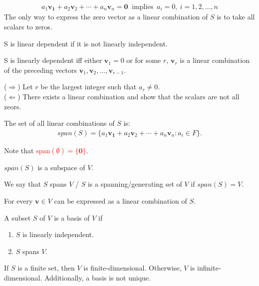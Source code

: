 \documentclass[12pt]{article}
\begin{document}
\begin{definition}
    \begin{align*}
        a_1\mathbf{v_1}+a_2\mathbf{v}_2+\cdots+a_n\mathbf{v}_n=\mathbf{0}\ \text{ implies }\, a_i =0 ,\ i=1,2,\ldots,n
    \end{align*}
The only way to express the zero vector as a linear combination of $S$ is to take all scalars to zeros.
\end{definition}

S is linear dependent if it is not linearly independent.

\begin{theorem}
   S is linearly dependent iff either $\mathbf{v}_1=0$ or for some $r$,
   $\mathbf{v}_r$ is a linear combination of the preceding vectors $\mathbf{v}_1,\mathbf{v}_2,\ldots,\mathbf{v}_{r-1}$.
\label{linear-dependent-algorithm}
\end{theorem}


\begin{tcolorbox}[boxrule=0.5pt]
\begin{pf}
($\Rightarrow$) Let $r$ be the largest integer such that $a_r\neq 0$.\\
($\Leftarrow$) There exists a linear combination and show that the scalars are not all zeors.
\end{pf}
\end{tcolorbox}

\begin{definition}
    The set of all linear combinations of $S$ is:
    \begin{align*}
        span(S)=\{a_1\mathbf{v_1}+a_2\mathbf{v}_2+\cdots+a_n\mathbf{v}_n:a_i\in F\}.
    \end{align*}
\end{definition}

Note that \textcolor{red}{$\text{span}(\emptyset)=\{\mathbf{0}\}$}.

\begin{theorem}
    $span(S)$ is a subspace of $V$.
\end{theorem}

\begin{definition}
    We say that $S$ spans $V$ / $S$ is a spanning/generating set of $V$
     if $span(S)=V$.
\end{definition}
For every $\mathbf{v} \in V$ can be expressed as a linear combination of $S$.

\begin{definition}[Basis]
    A subset $S$ of $V$ is a basis of $V$ if
    \begin{enumerate}
        \item $S$ is linearly independent.
        \item $S$ spans $V$.
    \end{enumerate}
\end{definition}
If $S$ is a finite set, then $V$ is finite-dimensional.
Otherwise, $V$ is infinite-dimensional.
Additionally, a basis is not unique.
\end{document}
